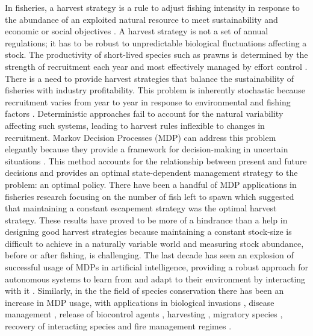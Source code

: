 In fisheries, a harvest strategy is a rule to adjust fishing intensity in response to the abundance of an exploited natural resource to meet sustainability and economic or social objectives \citep{hil92b}. A harvest strategy is not a set of annual regulations; it has to be robust to unpredictable biological fluctuations affecting a stock. The productivity of short-lived species such as prawns is determined by the strength of recruitment each year and most effectively managed by effort control \citep{garcia88c}. There is a need to provide harvest strategies that balance the sustainability of fisheries with industry profitability. This problem is inherently stochastic because recruitment varies from year to year in response to environmental and fishing factors \citep{KienzleEtAl2017}. Deterministic approaches fail to account for the natural variability affecting such systems, leading to harvest rules inflexible to changes in recruitment. Markov Decision Processes (MDP) can address this problem elegantly because they provide a framework for decision-making in uncertain situations \citep{puterman_markov_1994}. This method accounts for the relationship between present and future decisions and provides an optimal state-dependent management strategy to the problem: an optimal policy. There have been a handful of MDP applications in fisheries research focusing on the number of fish left to spawn \citep{Mendelssohn1980a, LUDWIG1982273} which suggested that maintaining a constant escapement strategy was the optimal harvest strategy. These results have proved to be more of a hindrance than a help in designing good harvest strategies \citep{hil92b} because maintaining a constant stock-size is difficult to achieve in a naturally variable world and measuring stock abundance, before or after fishing, is challenging. The last decade has seen an explosion of successful usage of MDPs in artificial intelligence, providing a robust approach for autonomous systems to learn from and adapt to their environment by interacting with it \citep{Kochenderfer:2015:DMU:2815660}. Similarly, in the the field of species conservation there has been an increase in MDP usage, with applications in biological invasions \citep{firn_managing_2008,regan_optimal_2006}, disease management \citep{chades_general_2011}, release of biocontrol agents \citep{shea_optimal_2000}, harvesting \citep{williams_adaptive_1996}, migratory species \citep{nicol_adaptive_2013}, recovery of interacting species \citep{chades_setting_2012} and fire management regimes \citep{mccarthy_using_2001,possingham_optimal_1997,richards_optimal_1999}. \\

